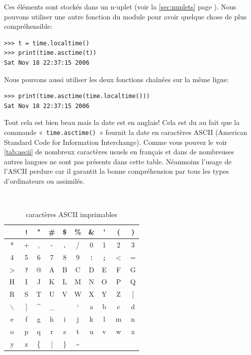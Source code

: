 Ces éléments sont stockés dans un n-uplet (voir la \autoref{sec:nuplets} page \pageref{sec:nuplets}). Nous pouvons utiliser une autre fonction du module pour avoir quelque chose de plus compréhensible:

\begin{Verbatim}[frame=single,rulecolor=\color{mbleu}, label=à taper]
>>> t = time.localtime()
>>> print(time.asctime(t))
Sat Nov 18 22:37:15 2006
\end{Verbatim}

Nous pouvons aussi utiliser les deux fonctions chaînées sur la même ligne:

\begin{Verbatim}[frame=single,rulecolor=\color{mbleu}, label=à taper]
>>> print(time.asctime(time.localtime()))
Sat Nov 18 22:37:15 2006
\end{Verbatim}

Tout cela est bien beau mais la date est en anglais! Cela est du au fait que la commande « \texttt{time.asctime()} » fournit la date en caractères ASCII (American Standard Code for Information Interchange). Comme vous pouvez le voir \autoref{tab:ascii} de nombreux caractères usuels en français et dans de nombreuses autres langues ne sont pas présents dans cette table. Néanmoins l'usage de l'ASCII perdure car il garantit la bonne compréhension par tous les types d'ordinateurs ou assimilés.

\begin{table}[h!]
\tt
\centering
\begin{tabular}{|c|c|c|c|c|c|c|c|c|c|}
\hline 
\verb*+ + & \verb+!+ & " & \# & \$ & \% & \& & ' & ( & ) \\ 
\hline
* & + & , & - & \verb+.+ & / & 0 & 1 & 2 & 3 \\ 
\hline
4 & 5 & 6 & 7 & 8 & 9 & \verb+:+ & \verb+;+ & $<$ & = \\ 
\hline
$>$ & \verb+?+ & @ & A & B & C & D & E & F & G \\ 
\hline
H & I & J & K & L & M & N & O & P & Q \\ 
\hline
R & S & T & U & V & W & X & Y & Z & [ \\ 
\hline
$\backslash$ & ] & \textasciicircum & \_ &  & ` & a & b & c & d \\ 
\hline
e & f & g & h & i & j & k & l & m & n \\ 
\hline
o & p & q & r & s & t & u & v & w & x \\ 
\hline
y & z & \{ & | & \} & \textasciitilde &  &  &  &  \\ 
\hline
\end{tabular}
\rm
\caption{caractères ASCII imprimables} \label{tab:ascii}
\end{table}

